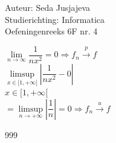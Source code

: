 \documentclass[a4paper]{article}
\newcommand{\limit}{\lim\limits}
\begin{document}
\noindent \large Auteur: Seda Jusjajeva\\
\noindent \large Studierichting: Informatica\\
\noindent \large Oefeningenreeks 6F nr. 4\\

\medskip

\normalsize


$\limit_{n \rightarrow \infty} \dfrac{1}{nx^2} = 0 \Rightarrow f_n \overset{p}{\rightarrow} f$ \\

$\limsup\limits_{x \in [1,+\infty[} \left|\dfrac{1}{nx^2} - 0\right|$ \\

$x \in [1,+\infty[$ \\

$= \limsup\limits_{n \rightarrow +\infty} \left|\dfrac{1}{n}\right| = 0 \Rightarrow f_n \overset{u}{\rightarrow}f$ \\




\begin{thebibliography}{999}
\end{thebibliography}
\end{document}
